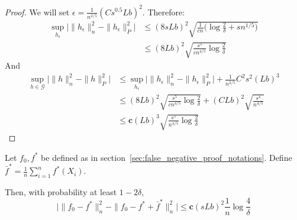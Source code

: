 \begin{proof}
We will set $\epsilon = \frac{1}{n^{2/5}} (C s^{0.5} L b)^2$. 
Therefore:
\begin{align*}
\sup_{h_\epsilon} \Big|  \|h_\epsilon\|^2_n - \|h_\epsilon\|^2_P \Big| &\leq
   (8sLb)^2 \sqrt{ \frac{1}{cn} \big(\log \frac{2}{\delta} 
        + s n^{1/5}  \big) } \\
  &\leq (8Lb)^2 \sqrt{ \frac{s^5}{cn^{4/5}} \log \frac{2}{\delta} }
\end{align*}
And
\begin{align*}
\sup_{h \in \mathcal{G}}  \Big| \|h\|^2_n - \|h\|^2_P \Big| &\leq 
\sup_{h_\epsilon} \Big| \|h_\epsilon\|^2_n - \|h_\epsilon\|^2_P \Big| 
        + \frac{1}{n^{2/5}} C^2 s^2 (Lb)^3 \\
  &\leq (8Lb)^2 \sqrt{ \frac{s^5}{c n^{4/5}} \log \frac{2}{\delta}}
     + (CLb)^2 \sqrt{ \frac{s^4}{n^{4/5}} } \\
  &\leq \mathbf{c} (Lb)^3 \sqrt{ \frac{s^5}{n^{4/5}} \log \frac{2}{\delta}}
\end{align*}

\end{proof}



\begin{lemma}
\label{lem:remove_centering}

Let $f_0, f^*$ be defined as in section~\ref{sec:false_negative_proof_notations}. Define $\bar{f}^* = \frac{1}{n} \sum_{i=1}^n f^*(X_i)$.

Then, with probability at least $1 - 2\delta$,
\[
\Big | \| f_0 - f^* \|_n^2 - \| f_0 - f^* + \bar{f}^* \|_n^2 \Big| \leq
    \mathbf{c} (sLb)^2 \frac{1}{n} \log \frac{4}{\delta}
\]
\end{lemma}

